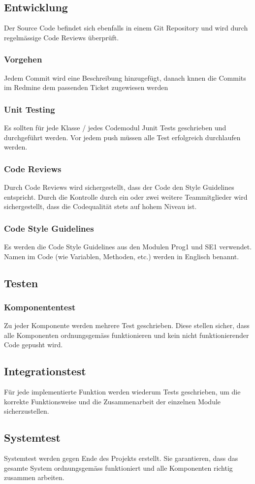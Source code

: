\documentclass[11pt]{scrartcl}
\begin{document}
\subsection{Entwicklung}
\label{sec:Entwicklung}
Der Source Code befindet sich ebenfalls in einem Git Repository und wird durch regelmässige Code Reviews überprüft.
\subsubsection{Vorgehen}
\label{sec:Vorgehen}
Jedem Commit wird eine Beschreibung hinzugefügt, danach knnen die Commits im Redmine dem passenden Ticket zugewiesen werden
\subsubsection{Unit Testing}
\label{sec:Unit Tesing}
Es sollten für jede Klasse / jedes Codemodul Junit Tests geschrieben und durchgeführt werden. Vor jedem push müssen alle Test erfolgreich durchlaufen werden.
\subsubsection{Code Reviews}
\label{sec:Code Reviews}
Durch Code Reviews wird sichergestellt, dass der Code den Style Guidelines entspricht.
Durch die Kontrolle durch ein oder zwei weitere Teammitglieder wird sichergestellt, dass die Codequalität stets auf hohem Niveau ist.
\subsubsection{Code Style Guidelines}
\label{sec:Code Style Guidelines}
Es werden die Code Style Guidelines aus den Modulen Prog1 und SE1 verwendet. Namen im Code (wie Variablen, Methoden, etc.) werden in Englisch benannt.
\subsection{Testen}
\label{sec:Testen}
\subsubsection{Komponententest}
\label{sec:Komponententest}
Zu jeder Komponente werden mehrere Test geschrieben. Diese stellen sicher, dass alle Komponenten ordnungsgemäss funktionieren und kein nicht funktionierender Code gepusht wird.
\subsection{Integrationstest}
\label{sec:Integrationstest}
Für jede implementierte Funktion werden wiederum Tests geschrieben, um die korrekte Funktionsweise und die Zusammenarbeit der einzelnen Module sicherzustellen.
\subsection{Systemtest}
\label{sec:Systemtest}
Systemtest werden gegen Ende des Projekts erstellt. Sie garantieren, dass das gesamte System ordnungsgemäss funktioniert und alle Komponenten richtig zusammen arbeiten.
\end{document}
